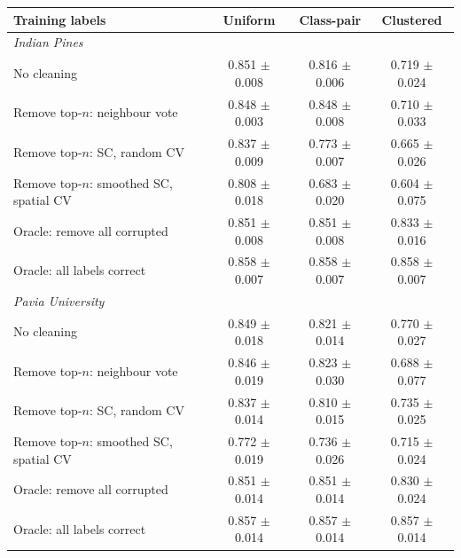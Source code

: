 \begin{tabular}{l ccc}
\toprule
Training labels & Uniform & Class-pair & Clustered \\
\midrule
\multicolumn{4}{l}{\textit{Indian Pines}} \\
No cleaning & 0.851 $\pm$ 0.008 & 0.816 $\pm$ 0.006 & 0.719 $\pm$ 0.024 \\
Remove top-$n$: neighbour vote & 0.848 $\pm$ 0.003 & 0.848 $\pm$ 0.008 & 0.710 $\pm$ 0.033 \\
Remove top-$n$: SC, random CV & 0.837 $\pm$ 0.009 & 0.773 $\pm$ 0.007 & 0.665 $\pm$ 0.026 \\
Remove top-$n$: smoothed SC, spatial CV & 0.808 $\pm$ 0.018 & 0.683 $\pm$ 0.020 & 0.604 $\pm$ 0.075 \\
Oracle: remove all corrupted & 0.851 $\pm$ 0.008 & 0.851 $\pm$ 0.008 & 0.833 $\pm$ 0.016 \\
Oracle: all labels correct & 0.858 $\pm$ 0.007 & 0.858 $\pm$ 0.007 & 0.858 $\pm$ 0.007 \\
\midrule
\multicolumn{4}{l}{\textit{Pavia University}} \\
No cleaning & 0.849 $\pm$ 0.018 & 0.821 $\pm$ 0.014 & 0.770 $\pm$ 0.027 \\
Remove top-$n$: neighbour vote & 0.846 $\pm$ 0.019 & 0.823 $\pm$ 0.030 & 0.688 $\pm$ 0.077 \\
Remove top-$n$: SC, random CV & 0.837 $\pm$ 0.014 & 0.810 $\pm$ 0.015 & 0.735 $\pm$ 0.025 \\
Remove top-$n$: smoothed SC, spatial CV & 0.772 $\pm$ 0.019 & 0.736 $\pm$ 0.026 & 0.715 $\pm$ 0.024 \\
Oracle: remove all corrupted & 0.851 $\pm$ 0.014 & 0.851 $\pm$ 0.014 & 0.830 $\pm$ 0.024 \\
Oracle: all labels correct & 0.857 $\pm$ 0.014 & 0.857 $\pm$ 0.014 & 0.857 $\pm$ 0.014 \\
\bottomrule
\end{tabular}